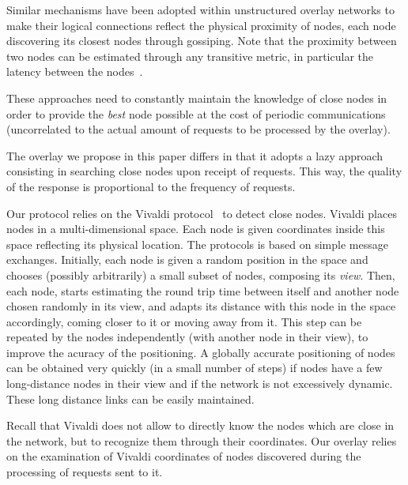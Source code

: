 Similar mechanisms have been adopted within unstructured overlay networks to
make their logical connections reflect the physical proximity of nodes, each
node discovering its closest nodes through gossiping. Note that the proximity
between two nodes can be estimated through any transitive metric, in particular
the latency between the nodes~\cite{tman}.


These approaches need to constantly maintain the knowledge of close nodes in
order to provide the \emph{best} node possible at the cost of periodic
communications (uncorrelated to the actual amount of requests to be processed by
the overlay).

The overlay we propose in this paper differs in that it adopts a lazy approach
consisting in searching close nodes upon receipt of requests. This way, the
quality of the response is proportional to the frequency of requests. 

Our protocol relies on the Vivaldi protocol~\cite{dabek:2001:sigcomm04} to
detect close nodes. Vivaldi places nodes in a multi-dimensional space. Each node
is given coordinates inside this space reflecting its physical location. The
protocols is based on simple message exchanges. Initially, each node is given a
random position in the space and chooses (possibly arbitrarily) a small subset
of nodes, composing its \emph{view}. Then, each node, starts estimating the
round trip time between itself and another node chosen randomly in its view, and
adapts its distance with this node in the space accordingly, coming closer to it
or moving away from it. This step can be repeated by the nodes independently
(with another node in their view), to improve the acuracy of the positioning. A
globally accurate positioning of nodes can be obtained very quickly (in a small
number of steps) if nodes have a few long-distance nodes in their view and if
the network is not excessively dynamic. These long distance links can be easily
maintained. 

Recall that Vivaldi does not allow to directly know the nodes which are close in
the network, but to recognize them through their coordinates. Our overlay relies
on the examination of Vivaldi coordinates of nodes discovered during the
processing of requests sent to it.







